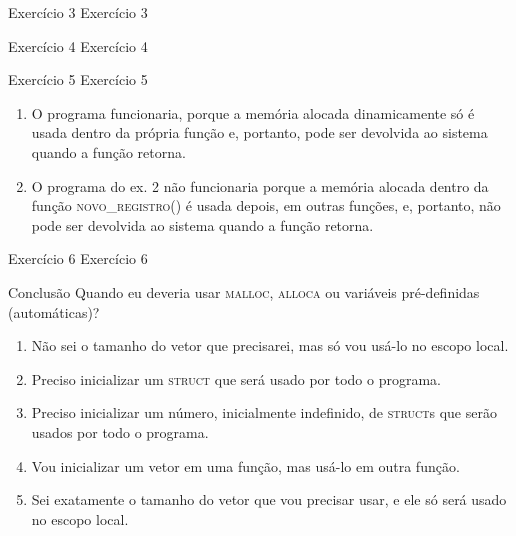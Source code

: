 \documentclass{beamer}
\begin{document}
\begin{frame}[fragile]{Exercício 3}
  \centering
  \Large
  Exercício 3
\end{frame}

\begin{frame}[fragile]{Exercício 4}
  \centering
  \Large
  Exercício 4
\end{frame}

\begin{frame}[fragile]{Exercício 5}
  \centering
  \Large
  Exercício 5
  \begin{enumerate}
    \item <2-> O programa funcionaria, porque a memória alocada dinamicamente só
      é usada dentro da própria função e, portanto, pode ser devolvida ao
      sistema quando a função retorna.
    \item <3-> O programa do ex. 2 não funcionaria porque a memória alocada
      dentro da função \textsc{novo\_registro()} é usada depois,
      em outras funções, e, portanto, não
      pode ser devolvida ao sistema quando a função retorna.
  \end{enumerate}
\end{frame}

\begin{frame}[fragile]{Exercício 6}
  \centering
  \Large
  Exercício 6
\end{frame}

\begin{frame}[fragile]{Conclusão}
  \centering
  \Large
  Quando eu deveria usar \textsc{malloc}, \textsc{alloca} ou variáveis
  pré-definidas (automáticas)?
  \begin{enumerate}
    \item Não sei o tamanho do vetor que precisarei, mas só vou usá-lo no escopo
    local.
    \item Preciso inicializar um \textsc{struct} que será usado por todo o
    programa.
    \item Preciso inicializar um número, inicialmente indefinido,
    de \textsc{struct}s que serão usados por todo o programa.
    \item Vou inicializar um vetor em uma função, mas usá-lo em outra função.
    \item Sei exatamente o tamanho do vetor que vou precisar usar, e ele só será
    usado no escopo local.
  \end{enumerate}

\end{frame}
\end{document}
